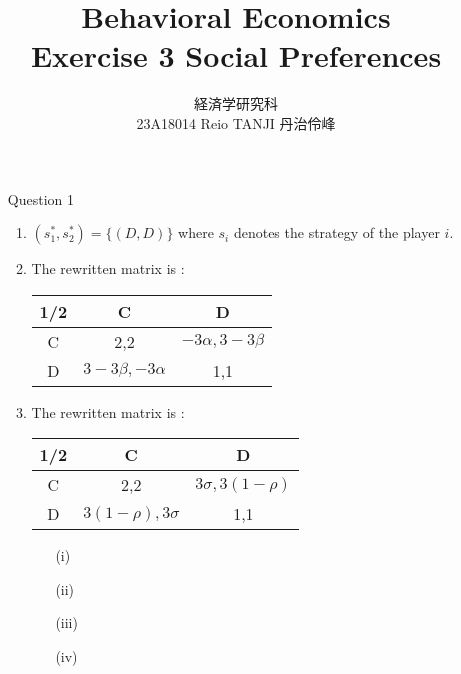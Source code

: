 \documentclass{jsarticle}
\begin{document}
\title{Behavioral Economics \\
Exercise 3 Social Preferences}
\author{経済学研究科　 \\ 23A18014 Reio TANJI 丹治伶峰}
\date{}
\maketitle

\begin{enumerate}

\item [Question 1]

\begin{enumerate}

\item $(s_1^*,s_2^*)=\{(D,D)\}$ where $s_i$ denotes the strategy of the player $i$.

\item

The rewritten matrix is :

\begin{center}

\begin{tabular}{|c|c|c|} \hline
1/2 & C & D \\ \hline
C & 2,2 & $-3\alpha, 3-3\beta$ \\ \hline
D & $3-3\beta, -3\alpha$ & 1,1 \\ \hline
\end{tabular}

\end{center}

\item

The rewritten matrix is :

\begin{center}

\begin{tabular}{|c|c|c|} \hline
1/2 & C & D \\ \hline
C & 2,2 & $3\sigma, 3(1-\rho)$ \\ \hline
D & $3(1-\rho),3\sigma$ & 1,1 \\ \hline
\end{tabular} 

\end{center}

\begin{enumerate}

\item[(i)]

\item[(ii)]

\item[(iii)]

\item[(iv)]

\end{enumerate}


\end{enumerate}

\end{enumerate}
\end{document}
